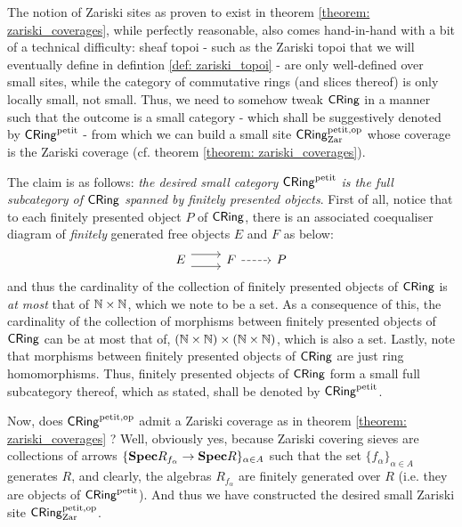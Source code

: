                     \begin{remark} \label{remark: big_and_small_zariski_sites}
                        The notion of Zariski sites as proven to exist in theorem \ref{theorem: zariski_coverages}, while perfectly reasonable, also comes hand-in-hand with a bit of a technical difficulty: sheaf topoi - such as the Zariski topoi that we will eventually define in defintion \ref{def: zariski_topoi} - are only well-defined over small sites, while the category of commutative rings (and slices thereof) is only locally small, not small. Thus, we need to somehow tweak $\mathsf{CRing}$ in a manner such that the outcome is a small category - which shall be suggestively denoted by $\mathsf{CRing}^{\mathrm{petit}}$ - from which we can build a small site $\mathsf{CRing}^{\mathrm{petit}, \mathrm{op}}_{\mathrm{Zar}}$ whose coverage is the Zariski coverage (cf. theorem \ref{theorem: zariski_coverages}).
                        
                        The claim is as follows: \textit{the desired small category $\mathsf{CRing}^{\mathrm{petit}}$ is the full subcategory of $\mathsf{CRing}$ spanned by finitely presented objects}. First of all, notice that to each finitely presented object $P$ of $\mathsf{CRing}$, there is an associated coequaliser diagram of \textit{finitely} generated free objects $E$ and $F$ as below:
                            $$
                                \begin{tikzcd}
                                	E & F & P
                                	\arrow[shift right=2, from=1-1, to=1-2]
                                	\arrow[shift left=2, from=1-1, to=1-2]
                                	\arrow[dashed, from=1-2, to=1-3]
                                \end{tikzcd}
                            $$
                        and thus the cardinality of the collection of finitely presented objects of $\mathsf{CRing}$ is \textit{at most} that of $\N \x \N$, which we note to be a set. As a consequence of this, the cardinality of the collection of morphisms between finitely presented objects of $\mathsf{CRing}$ can be at most that of, $(\N \x \N) \x (\N \x \N)$, which is also a set. Lastly, note that morphisms between finitely presented objects of $\mathsf{CRing}$ are just ring homomorphisms. Thus, finitely presented objects of $\mathsf{CRing}$ form a small full subcategory thereof, which as stated, shall be denoted by $\mathsf{CRing}^{\mathrm{petit}}$. 
                        
                        Now, does $\mathsf{CRing}^{\mathrm{petit}, \mathrm{op}}$ admit a Zariski coverage as in theorem \ref{theorem: zariski_coverages} ? Well, obviously yes, because Zariski covering sieves are collections of arrows $\{\mathbf{Spec} R_{f_{\alpha}} \to \mathbf{Spec} R\}_{\alpha \in A}$ such that the set $\{f_{\alpha}\}_{\alpha \in A}$ generates $R$, and clearly, the algebras $R_{f_{\alpha}}$ are finitely generated over $R$ (i.e. they are objects of $\mathsf{CRing}^{\mathrm{petit}}$). And thus we have constructed the desired small Zariski site $\mathsf{CRing}^{\mathrm{petit}, \mathrm{op}}_{\mathrm{Zar}}$. 
                        

\end{remark}
